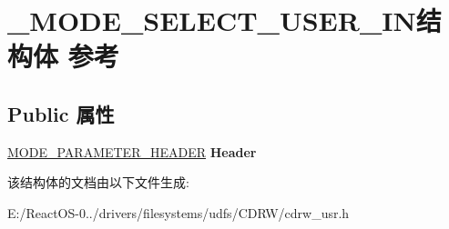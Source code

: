 \hypertarget{struct___m_o_d_e___s_e_l_e_c_t___u_s_e_r___i_n}{}\section{\+\_\+\+M\+O\+D\+E\+\_\+\+S\+E\+L\+E\+C\+T\+\_\+\+U\+S\+E\+R\+\_\+\+I\+N结构体 参考}
\label{struct___m_o_d_e___s_e_l_e_c_t___u_s_e_r___i_n}
\subsection*{Public 属性}
\begin{DoxyCompactItemize}
\item 
\mbox{\label{struct___m_o_d_e___s_e_l_e_c_t___u_s_e_r___i_n_a53771f4756b4f266fd0cc76b0de539f8}} 
\hyperlink{struct___m_o_d_e___p_a_r_a_m_e_t_e_r___h_e_a_d_e_r}{M\+O\+D\+E\+\_\+\+P\+A\+R\+A\+M\+E\+T\+E\+R\+\_\+\+H\+E\+A\+D\+ER} {\bfseries Header}
\end{DoxyCompactItemize}


该结构体的文档由以下文件生成\+:\begin{DoxyCompactItemize}
\item 
E\+:/\+React\+O\+S-\/0../drivers/filesystems/udfs/\+C\+D\+R\+W/cdrw\+\_\+usr.\+h\end{DoxyCompactItemize}
